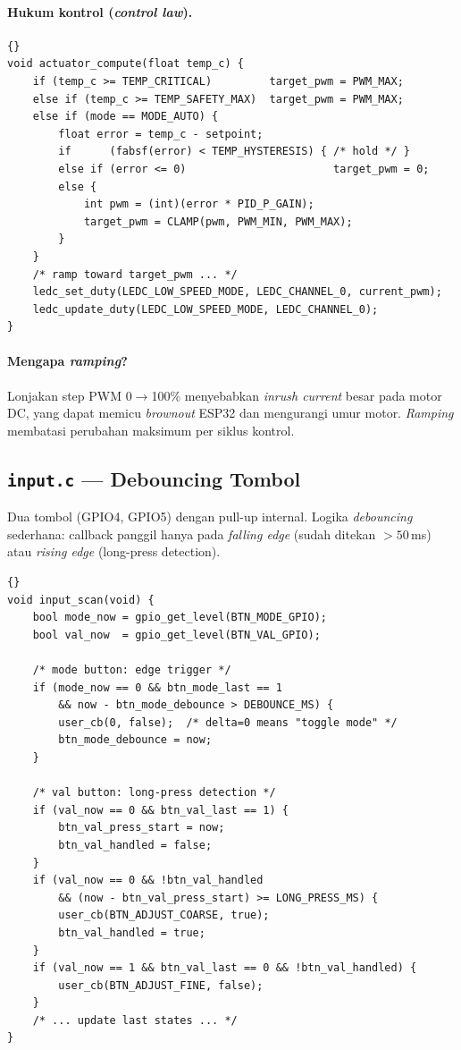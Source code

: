 \documentclass[11pt,a4paper]{article}
\begin{document}
\paragraph{Hukum kontrol (\emph{control law}).}
\begin{lstlisting}[caption={AUTO mode proportional control}]{}
void actuator_compute(float temp_c) {
    if (temp_c >= TEMP_CRITICAL)         target_pwm = PWM_MAX;
    else if (temp_c >= TEMP_SAFETY_MAX)  target_pwm = PWM_MAX;
    else if (mode == MODE_AUTO) {
        float error = temp_c - setpoint;
        if      (fabsf(error) < TEMP_HYSTERESIS) { /* hold */ }
        else if (error <= 0)                       target_pwm = 0;
        else {
            int pwm = (int)(error * PID_P_GAIN);
            target_pwm = CLAMP(pwm, PWM_MIN, PWM_MAX);
        }
    }
    /* ramp toward target_pwm ... */
    ledc_set_duty(LEDC_LOW_SPEED_MODE, LEDC_CHANNEL_0, current_pwm);
    ledc_update_duty(LEDC_LOW_SPEED_MODE, LEDC_CHANNEL_0);
}
\end{lstlisting}

\paragraph{Mengapa \emph{ramping}?} Lonjakan step PWM 0$\rightarrow$100\% menyebabkan \emph{inrush current} besar pada motor DC, yang dapat memicu \emph{brownout} ESP32 dan mengurangi umur motor. \emph{Ramping} membatasi perubahan maksimum per siklus kontrol.

\subsection{\texttt{input.c} --- Debouncing Tombol}

Dua tombol (GPIO4, GPIO5) dengan pull-up internal. Logika \emph{debouncing} sederhana: callback panggil hanya pada \emph{falling edge} (sudah ditekan $>50$\,ms) atau \emph{rising edge} (long-press detection).

\begin{lstlisting}[caption={Mesin state tombol}]{}
void input_scan(void) {
    bool mode_now = gpio_get_level(BTN_MODE_GPIO);
    bool val_now  = gpio_get_level(BTN_VAL_GPIO);

    /* mode button: edge trigger */
    if (mode_now == 0 && btn_mode_last == 1
        && now - btn_mode_debounce > DEBOUNCE_MS) {
        user_cb(0, false);  /* delta=0 means "toggle mode" */
        btn_mode_debounce = now;
    }

    /* val button: long-press detection */
    if (val_now == 0 && btn_val_last == 1) {
        btn_val_press_start = now;
        btn_val_handled = false;
    }
    if (val_now == 0 && !btn_val_handled
        && (now - btn_val_press_start) >= LONG_PRESS_MS) {
        user_cb(BTN_ADJUST_COARSE, true);
        btn_val_handled = true;
    }
    if (val_now == 1 && btn_val_last == 0 && !btn_val_handled) {
        user_cb(BTN_ADJUST_FINE, false);
    }
    /* ... update last states ... */
}
\end{lstlisting}
\end{document}
